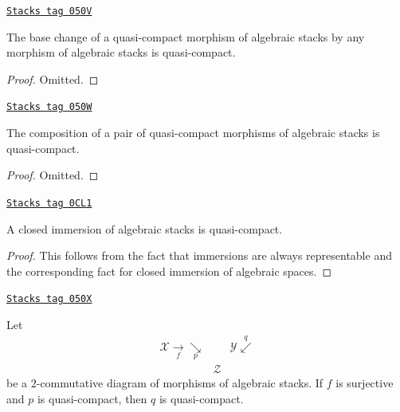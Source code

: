\begin{lemma}
\label{stacks-morphisms-lemma-base-change-quasi-compact}
\href{https://stacks.math.columbia.edu/tag/050V}{\texttt{Stacks tag 050V}}

The base change of a quasi-compact morphism of algebraic stacks
by any morphism of algebraic stacks is quasi-compact.
\end{lemma}

\begin{proof}
Omitted.
\end{proof}

\begin{lemma}
\label{stacks-morphisms-lemma-composition-quasi-compact}
\href{https://stacks.math.columbia.edu/tag/050W}{\texttt{Stacks tag 050W}}

The composition of a pair of quasi-compact morphisms of algebraic stacks
is quasi-compact.
\end{lemma}

\begin{proof}
Omitted.
\end{proof}

\begin{lemma}
\label{stacks-morphisms-lemma-closed-immersion-quasi-compact}
\href{https://stacks.math.columbia.edu/tag/0CL1}{\texttt{Stacks tag 0CL1}}

A closed immersion of algebraic stacks is quasi-compact.
\end{lemma}

\begin{proof}
This follows from the fact that immersions are always representable and
the corresponding fact for closed immersion of algebraic spaces.
\end{proof}

\begin{lemma}
\label{stacks-morphisms-lemma-surjection-from-quasi-compact}
\href{https://stacks.math.columbia.edu/tag/050X}{\texttt{Stacks tag 050X}}

Let
$$
\begin{array}{ccc}\mathcal{X} \underset{f}{\longrightarrow}\underset{p}{\searrow} &  & \mathcal{Y} \overset{q}{\swarrow} \\  & \mathcal{Z} & \end{array}
$$
be a $2$-commutative diagram of morphisms of algebraic stacks.
If $f$ is surjective and $p$ is quasi-compact, then $q$ is quasi-compact.
\end{lemma}

